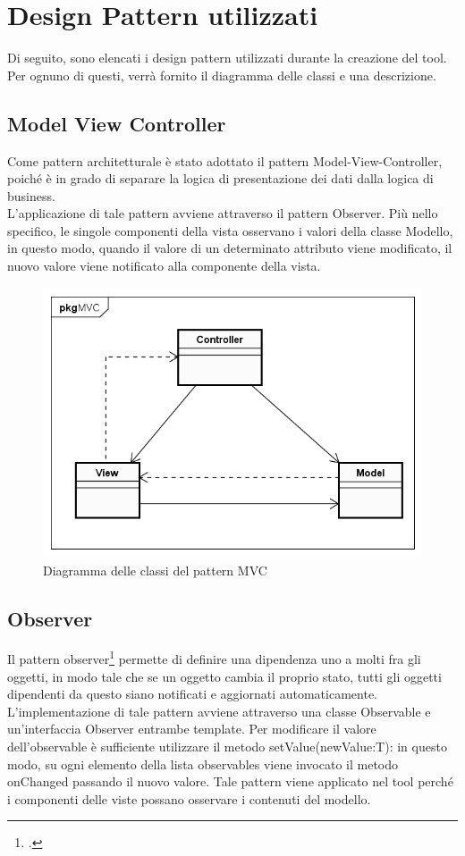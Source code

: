 
\section{Design Pattern utilizzati}\label{sec:design-pattern-utilizzati}
Di seguito, sono elencati i design pattern utilizzati durante la creazione del tool. Per ognuno di questi, verrà fornito il diagramma delle classi e una descrizione.
\subsection{Model View Controller}\label{subsec:model-view-controller}
Come pattern architetturale è stato adottato il pattern Model-View-Controller, poiché è in grado di separare la logica di presentazione dei dati dalla logica di business.\\
L'applicazione di tale pattern avviene attraverso il pattern Observer.
Più nello specifico, le singole componenti della vista osservano i valori della classe Modello, in questo modo, quando il valore di un determinato attributo viene modificato, il nuovo valore viene notificato alla componente della vista.

\begin{figure}[H]
    \centering
    \includegraphics[width=13cm, height=8cm]{./immagini/diagrammi_uml/mvc.png}
    \caption{Diagramma delle classi del pattern MVC}\label{fig:mvc}
\end{figure}

\newpage
\subsection{Observer}\label{subsec:observer}
Il pattern observer\footcite{womak:observer} permette di definire una dipendenza uno a molti fra gli
oggetti, in modo tale che se un oggetto cambia il proprio stato, tutti gli oggetti
dipendenti da questo siano notificati e aggiornati automaticamente.
L'implementazione di tale pattern avviene attraverso una classe Observable e un'interfaccia Observer entrambe template.
Per modificare il valore dell'observable è sufficiente utilizzare il metodo setValue(newValue:T): in questo modo, su ogni elemento della lista observables viene invocato il metodo onChanged passando il nuovo valore.
Tale pattern viene applicato nel tool perché i componenti delle viste possano osservare i contenuti del modello.

